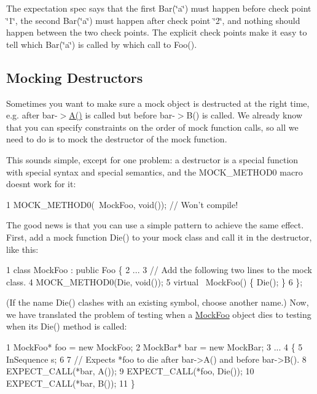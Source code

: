 The expectation spec says that the first {\ttfamily Bar(\char`\"{}a\char`\"{})} must happen before check point \char`\"{}1\char`\"{}, the second {\ttfamily Bar(\char`\"{}a\char`\"{})} must happen after check point \char`\"{}2\char`\"{}, and nothing should happen between the two check points. The explicit check points make it easy to tell which {\ttfamily Bar(\char`\"{}a\char`\"{})} is called by which call to {\ttfamily Foo()}.

\subsection*{Mocking Destructors}

Sometimes you want to make sure a mock object is destructed at the right time, e.\+g. after {\ttfamily bar-\/$>$\hyperlink{namespacetesting_a5e9134d655d2fc9323902348083282e7}{A()}} is called but before {\ttfamily bar-\/$>$B()} is called. We already know that you can specify constraints on the order of mock function calls, so all we need to do is to mock the destructor of the mock function.

This sounds simple, except for one problem\+: a destructor is a special function with special syntax and special semantics, and the {\ttfamily M\+O\+C\+K\+\_\+\+M\+E\+T\+H\+O\+D0} macro doesn\textquotesingle{}t work for it\+:


\begin{DoxyCode}
1 MOCK\_METHOD0(~MockFoo, void());  // Won't compile!
\end{DoxyCode}


The good news is that you can use a simple pattern to achieve the same effect. First, add a mock function {\ttfamily Die()} to your mock class and call it in the destructor, like this\+:


\begin{DoxyCode}
1 class MockFoo : public Foo \{
2   ...
3   // Add the following two lines to the mock class.
4   MOCK\_METHOD0(Die, void());
5   virtual ~MockFoo() \{ Die(); \}
6 \};
\end{DoxyCode}


(If the name {\ttfamily Die()} clashes with an existing symbol, choose another name.) Now, we have translated the problem of testing when a {\ttfamily \hyperlink{class_mock_foo}{Mock\+Foo}} object dies to testing when its {\ttfamily Die()} method is called\+:


\begin{DoxyCode}
1 MockFoo* foo = new MockFoo;
2 MockBar* bar = new MockBar;
3 ...
4 \{
5   InSequence s;
6 
7   // Expects *foo to die after bar->A() and before bar->B().
8   EXPECT\_CALL(*bar, A());
9   EXPECT\_CALL(*foo, Die());
10   EXPECT\_CALL(*bar, B());
11 \}
\end{DoxyCode}


